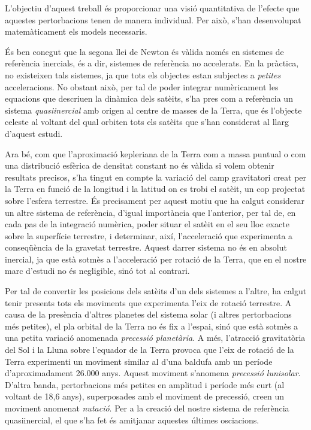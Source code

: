 \documentclass{article}
\begin{document}
L'objectiu d'aquest treball és proporcionar una visió quantitativa de l'efecte que aquestes pertorbacions tenen de manera individual. Per això, s'han desenvolupat matemàticament els models necessaris.

És ben conegut que la segona llei de Newton és vàlida només en sistemes de referència inercials, és a dir, sistemes de referència no accelerats. En la pràctica, no existeixen tals sistemes, ja que tots els objectes estan subjectes a \emph{petites} acceleracions. No obstant això, per tal de poder integrar numèricament les equacions que descriuen la dinàmica dels satè\lgem its, s'ha pres com a referència un sistema \emph{quasiinercial} amb origen al centre de masses de la Terra, que és l'objecte celeste al voltant del qual orbiten tots els satè\lgem its que s'han considerat al llarg d'aquest estudi.

Ara bé, com que l'aproximació kepleriana de la Terra com a massa puntual o com una distribució esfèrica de densitat constant no és vàlida si volem obtenir resultats precisos, s'ha tingut en compte la variació del camp gravitatori creat per la Terra en funció de la longitud i la latitud on es trobi el satè\lgem it, un cop projectat sobre l'esfera terrestre. És precisament per aquest motiu que ha calgut considerar un altre sistema de referència, d'igual importància que l'anterior, per tal de, en cada pas de la integració numèrica, poder situar el satè\lgem it en el seu lloc exacte sobre la superfície terrestre, i determinar, així, l'acceleració que experimenta a conseqüència de la gravetat terrestre. Aquest darrer sistema no és en absolut inercial, ja que està sotmès a l'acceleració per rotació de la Terra, que en el nostre marc d'estudi no és negligible, sinó tot al contrari.

Per tal de convertir les posicions dels satè\lgem its d'un dels sistemes a l'altre, ha calgut tenir presents tots els moviments que experimenta l'eix de rotació terrestre. A causa de la presència d'altres planetes del sistema solar (i altres pertorbacions més petites), el pla orbital de la Terra no és fix a l'espai, sinó que està sotmès a una petita variació anomenada \emph{precessió planetària}. A més, l'atracció gravitatòria del Sol i la Lluna sobre l'equador de la Terra provoca que l'eix de rotació de la Terra experimenti un moviment similar al d'una baldufa amb un període d'aproximadament 26.000 anys. Aquest moviment s'anomena \emph{precessió lunisolar}. D'altra banda, pertorbacions més petites en amplitud i període més curt (al voltant de 18,6 anys), superposades amb el moviment de precessió, creen un moviment anomenat \emph{nutació}. Per a la creació del nostre sistema de referència quasiinercial, el que s'ha fet és amitjanar aquestes últimes osci\lgem acions.
\end{document}
